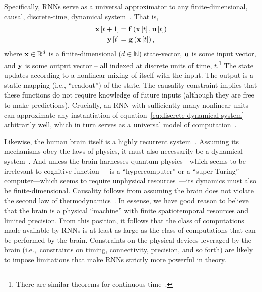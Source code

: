 Specifically, RNNs serve as a universal approximator to any finite-dimensional, causal, discrete-time, dynamical system~\citep{schafer2006recurrent}.
That is,
\begin{equation}
\begin{aligned} \label{eq:discrete-dynamical-system}
\mathbf{x}\left[ t + 1 \right] &= \mathbf{f}\left(\mathbf{x}\left[ t \right], \mathbf{u}\left[ t \right] \right) \\
\mathbf{y}\left[ t \right] &= \mathbf{g}\left(\mathbf{x}\left[ t \right] \right) \text{,}
\end{aligned}
\end{equation}
where $\mathbf{x} \in \mathbb{R}^d$ is a finite-dimensional ($d \in \mathbb{N}$) state-vector, $\mathbf{u}$ is some input vector, and $\mathbf{y}$ is some output vector -- all indexed at discrete units of time, $t$.\footnote{
There are similar theorems for continuous time~\citep{funahashi1993approximation, bennett1995universal}.
}
The state updates according to a nonlinear mixing of itself with the input.
The output is a static mapping (i.e., ``readout'') of the state.
The causality constraint implies that these functions do not require knowledge of future inputs (although they are free to make predictions).
Crucially, an RNN with sufficiently many nonlinear units can approximate any instantiation of equation~\ref{eq:discrete-dynamical-system} arbitrarily well, which in turn serves as a universal model of computation~\citep{turing1938computable}.

Likewise, the human brain itself is a highly recurrent system~\citep{dayan2001theoretical}.
Assuming its mechanisms obey the laws of physics, it must also necessarily be a dynamical system~\citep{amit1989modeling, mckenna1994brain, port1995mind}.
And unless the brain harnesses quantum physics---which seems to be irrelevant to cognitive function~\citep{litt2006brain}---is a ``hypercomputer'' or a ``super-Turing'' computer---which seems to require unphysical resources~\citep{broersma2018computability}---its dynamics must also be finite-dimensional.
Causality follows from assuming the brain does not violate the second law of thermodynamics~\citep{evans1996causality}.
In essense, we have good reason to believe that the brain is a physical ``machine'' with finite spatiotemporal resources and limited precision.
From this position, it follows that the class of computations made available by RNNs is at least as large as the class of computations that can be performed by the brain.
Constraints on the physical devices leveraged by the brain (i.e.,~constraints on timing, connectivity, precision, and so forth) are likely to impose limitations that make RNNs strictly more powerful in theory.

